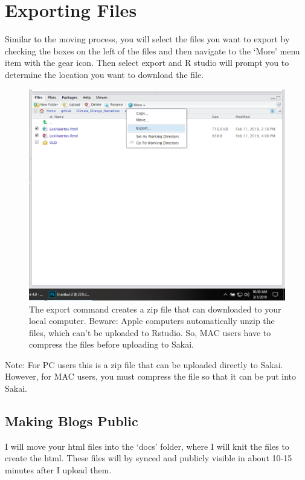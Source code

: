 \documentclass{article}\usepackage[]{graphicx}\usepackage[]{color}
\begin{document}
\section{Exporting Files}

Similar to the moving process, you will select the files you want to export by checking the boxes on the left of the files and then navigate to the `More' menu item with the gear icon. Then select export and R studio will prompt you to determine the location you want to download the file.

\begin{figure}[h]
\includegraphics[width=\textwidth]{ExportFiles}
\caption{The export command creates a zip file that can downloaded to your local computer. Beware: Apple computers automatically unzip the files, which can't be uploaded to Rstudio. So, MAC users have to compress the files before uploading to Sakai.}
\end{figure}

Note: For PC users this is a zip file that can be uploaded directly to Sakai. However, for MAC users, you must compress the file so that it can be put into Sakai. 

\subsection{Making Blogs Public}

I will move your html files into the `docs' folder, where I will knit the files to create the html. These files will by synced and publicly visible in about 10-15 minutes after I upload them. 
\end{document}
